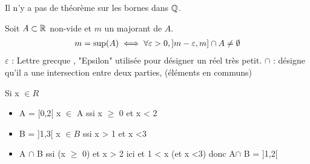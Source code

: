 \begin{remarque}
	Il n'y a pas de théorème sur les bornes dans $\mathbb{Q}$.
\end{remarque}

\begin{graybox}
	\begin{proposition}
		Soit $A \subset \mathbb{R}$ non-vide et $m$ un majorant de $A$. 
		\begin{align*}
			m = \textnormal{sup}(A) \iff \forall \varepsilon > 0, ]m - \varepsilon, m] \cap A \neq \emptyset
		\end{align*}
		$\varepsilon$ : \textnormal{Lettre grecque , "Epsilon" utilisée pour désigner un réel très petit.} %
		\newline
		$\cap$ : \textnormal{désigne qu'il a une intersection entre deux parties, (éléments en communs)}     
	\end{proposition}
\end{graybox}

\begin{exemple}
	Si x $\in R$
	\begin{itemize}
		\item \textnormal{A = [0,2[} \textnormal{x} $\in$ \textnormal{A ssi x} $\geq$ \textnormal{0 et x < 2}
		\item \textnormal{B = ]1,3[} \textnormal{x} $\in B$ \textnormal{ssi x > 1 et x <3}
		\item \textnormal{A} $\cap$ \textnormal{B} \textnormal{ssi (x} $\geq$ \textnormal{0) et x > 2 ici et 1 < x (et x <3) donc A}$\cap$ \textnormal{B = ]1,2[} 
	\end{itemize}
\end{exemple}


